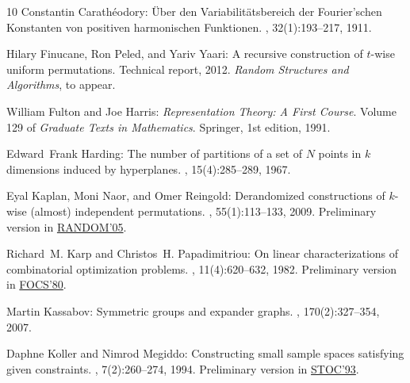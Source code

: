 \begin{thebibliography}{10}
{\sc Constantin Carath\'{e}odory}: \"{U}ber den {V}ariabilit\"{a}tsbereich der
  {F}ourier'schen {K}onstanten von positiven harmonischen {F}unktionen.
, 32(1):193--217,
  1911.
\newblock [\epfmtdoi{10.1007/BF03014795}]

{\sc Hilary Finucane, Ron Peled, and Yariv Yaari}: {A recursive construction of
  $t$-wise uniform permutations}.
\newblock Technical report, 2012.
\newblock \emph{Random Structures and Algorithms}, to appear.

{\sc William Fulton and Joe Harris}: {\em Representation Theory: A First
  Course}.
\newblock Volume 129 of {\em Graduate Texts in Mathematics}.
\newblock Springer, 1st edition, 1991.

{\sc Edward~Frank Harding}: The number of partitions of a set of {$N$} points
  in {$k$} dimensions induced by hyperplanes.
, 15(4):285--289, 1967.
\newblock [\epfmtdoi{10.1017/S0013091500011925}]

{\sc Eyal Kaplan, Moni Naor, and Omer Reingold}: Derandomized constructions of
  $k$-wise (almost) independent permutations.
, 55(1):113--133, 2009.
\newblock Preliminary version in
  \href{http://dx.doi.org/10.1007/11538462_30}{RANDOM'05}.
\newblock [\epfmtdoi{10.1007/s00453-008-9267-y}]

{\sc Richard~M. Karp and Christos~H. Papadimitriou}: On linear
  characterizations of combinatorial optimization problems.
, 11(4):620--632, 1982.
\newblock Preliminary version in
  \href{http://dx.doi.org/10.1109/SFCS.1980.29}{FOCS'80}.
\newblock [\epfmtdoi{10.1137/0211053}]

{\sc Martin Kassabov}: Symmetric groups and expander graphs.
, 170(2):327--354, 2007.
\newblock [\epfmtdoi{10.1007/s00222-007-0065-y}]

{\sc Daphne Koller and Nimrod Megiddo}: Constructing small sample spaces
  satisfying given constraints.
, 7(2):260--274, 1994.
\newblock Preliminary version in
  \href{http://dx.doi.org/10.1145/167088.167168}{STOC'93}.
\newblock [\epfmtdoi{10.1137/S0895480192228140}]


\end{thebibliography}
